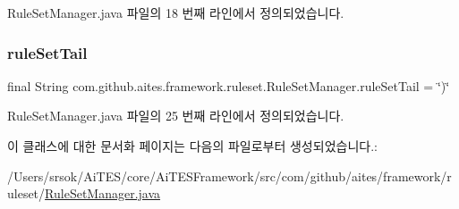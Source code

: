 Rule\+Set\+Manager.\+java 파일의 18 번째 라인에서 정의되었습니다.

\mbox{\label{classcom_1_1github_1_1aites_1_1framework_1_1ruleset_1_1_rule_set_manager_a6696dfa261a4ccc23236373f8d33b316}} 
\subsubsection{\texorpdfstring{rule\+Set\+Tail}{ruleSetTail}}
{\footnotesize\ttfamily final String com.\+github.\+aites.\+framework.\+ruleset.\+Rule\+Set\+Manager.\+rule\+Set\+Tail = \char`\"{})\char`\"{}\hspace{0.3cm}{\ttfamily [private]}}



Rule\+Set\+Manager.\+java 파일의 25 번째 라인에서 정의되었습니다.



이 클래스에 대한 문서화 페이지는 다음의 파일로부터 생성되었습니다.\+:\begin{DoxyCompactItemize}
\item 
/\+Users/srsok/\+Ai\+T\+E\+S/core/\+Ai\+T\+E\+S\+Framework/src/com/github/aites/framework/ruleset/\mbox{\hyperlink{_rule_set_manager_8java}{Rule\+Set\+Manager.\+java}}\end{DoxyCompactItemize}
